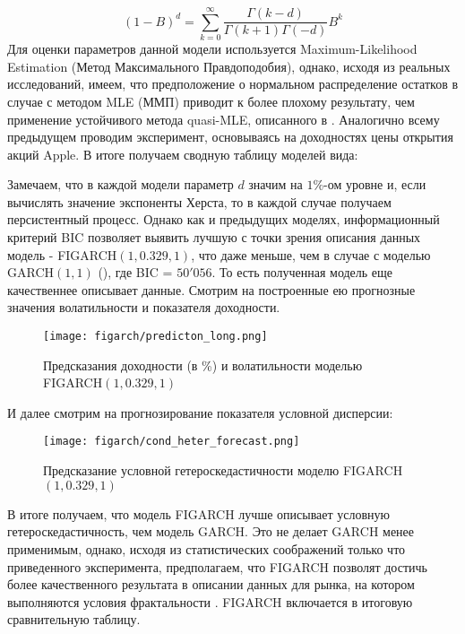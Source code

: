 \begin{equation}
	(1 - B)^d = \sum_{k = 0}^\infty \frac{\Gamma(k - d)}{\Gamma(k + 1)\Gamma(-d)}B^k
\end{equation}
Для оценки параметров данной модели используется Maximum-Likelihood Estimation (Метод Максимального Правдоподобия), однако, исходя из реальных исследований, имеем, что предположение о нормальном распределение остатков в случае с методом MLE (ММП) приводит к более плохому результату, чем применение устойчивого метода quasi-MLE, описанного в \cite{weiss1986asymptotic}. Аналогично всему предыдущем проводим эксперимент, основываясь на доходностях цены открытия акций Apple. В итоге получаем сводную таблицу моделей вида:



\noindent Замечаем, что в каждой модели параметр $d$ значим на $1\%$-ом уровне и, если вычислять значение экспоненты Херста, то в каждой случае получаем персистентный процесс. Однако как и предыдущих моделях, информационный критерий BIC позволяет выявить лучшую с точки зрения описания данных модель - FIGARCH$(1, 0.329, 1)$, что даже меньше, чем в случае с моделью GARCH$(1, 1)$ (), где BIC = $50'056$. То есть полученная модель еще качественнее описывает данные. Смотрим на построенные ею прогнозные значения волатильности и показателя доходности.
\begin{figure}[H]
	\centering
	\texttt{[image: figarch/predicton\_long.png]}
	\caption{Предсказания доходности (в \%) и волатильности моделью FIGARCH$(1, 0.329, 1)$}
\end{figure}
\noindent И далее смотрим на прогнозирование показателя условной дисперсии:
\begin{figure}[H]
	\centering
	\texttt{[image: figarch/cond\_heter\_forecast.png]}
	\caption{Предсказание условной гетероскедастичности моделю FIGARCH$(1, 0.329, 1)$}
\end{figure}
\noindent В итоге получаем, что модель FIGARCH лучше описывает условную гетероскедастичность, чем модель GARCH. Это не делает GARCH менее применимым, однако, исходя из статистических соображений только что приведенного эксперимента, предполагаем, что FIGARCH позволят достичь более качественного результата в описании данных для рынка, на котором выполняются условия фрактальности \cite{fractal_market}. FIGARCH включается в итоговую сравнительную таблицу.